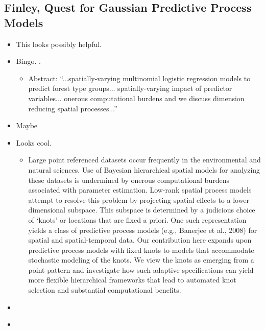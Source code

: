 \documentclass{article}
\begin{document}
\subsection*{Finley, Quest for Gaussian Predictive Process Models}
\begin{itemize}
\item This \citep{Finley2009} looks possibly helpful.
\item Bingo. \citep{Finley2009_2}. 
      \begin{itemize}
      \item Abstract: ``...spatially-varying multinomial logistic regression models to predict forest type groups... spatially-varying impact of predictor variables... onerous computational burdens and we discuss dimension reducing spatial processes...''
      \end{itemize}
\item Maybe \citep{Finley2011}
\item Looks cool. \citep{Guhaniyogi2011}
  \begin{itemize}
  \item Large point referenced datasets occur frequently in the environmental and natural sciences. Use of Bayesian hierarchical spatial models for analyzing these datasets is undermined by onerous computational burdens associated with parameter estimation. Low-rank spatial process models attempt to resolve this problem by projecting spatial effects to a lower-dimensional subspace. This subspace is determined by a judicious choice of ‘knots’ or locations that are fixed a priori. One such representation yields a class of predictive process models (e.g., Banerjee et al., 2008) for spatial and spatial-temporal data. Our contribution here expands upon predictive process models with fixed knots to models that accommodate stochastic modeling of the knots. We view the knots as emerging from a point pattern and investigate how such adaptive specifications can yield more flexible hierarchical frameworks that lead to automated knot selection and substantial computational benefits.
  \end{itemize}
\item \citep{Finley2012}
\item \citep{Eidsvik2012}
  \begin{itemize}

\end{itemize}
\end{itemize}
\end{document}
